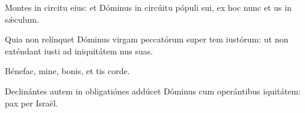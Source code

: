 \item {}

\item Montes in circitu eius: \psstar{} et Dóminus in circúitu pópuli sui, ex hoc nunc et us in sǽculum.

\item Quia non relínquet Dóminus virgam peccatórum super tem iustórum:\psstar{} ut non exténdant iusti ad iniquitátem nus suas.

\item Bénefac, mine, bonis,\psstar{} et tis corde.

\item Declinántes autem in obligatiónes addúcet Dóminus cum operántibus iquitátem:\psstar{} pax per Israël.
